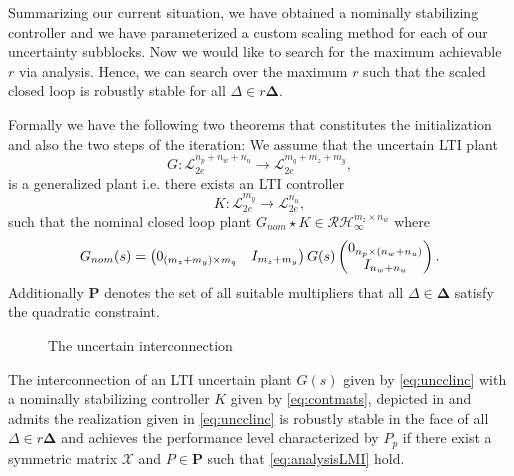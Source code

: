 Summarizing our current situation, we have obtained a nominally stabilizing controller and we have parameterized a custom scaling method for each of our 
uncertainty subblocks. Now we would like to search for the maximum achievable $r$ via analysis. Hence, we can search over the maximum $r$ such that the 
scaled closed loop is robustly stable for all $\Delta\in r\bm{\Delta}$. 



Formally we have the following two theorems that constitutes the initialization and also the two steps of the iteration: We assume that 
the uncertain LTI plant 
\[
G:\mathcal{L}_{2e}^{n_p+n_w+n_u}\to\mathcal{L}_{2e}^{m_q+m_z+m_y},
\] 
is a generalized plant i.e. there exists an LTI controller 
\[
K:\mathcal{L}_{2e}^{m_y}\to\mathcal{L}_{2e}^{n_u},
\]
such that the nominal closed loop plant $G_{nom}\star K\in\mathcal{RH}_\infty^{m_z\times n_w}$ where 
\[
G_{nom}(s) = \begin{pmatrix}0_{(m_z+m_y)\times m_q} &I_{m_z+m_y}\end{pmatrix}G(s)\begin{pmatrix}0_{n_p\times(n_w+n_u)}\\I_{n_w+n_u}\end{pmatrix}. 
\]
Additionally $\mathbf{P}$ denotes the set of all suitable multipliers that all $\Delta\in\bm{\Delta}$ satisfy the 
quadratic constraint.

\begin{figure}%
\centering
{}
\caption{The uncertain interconnection}%
\label{fig:uncicsynth}%
\end{figure}

\begin{thm} The interconnection of an LTI uncertain plant $G(s)$ given by \eqref{eq:uncclinc}
with a nominally stabilizing controller $K$ given by \eqref{eq:contmats}, depicted in  
and admits the realization given in \eqref{eq:uncclinc} is robustly stable in the face of all 
$\Delta\in r\bm{\Delta}$ and achieves the performance level characterized by $P_p$ if there exist a symmetric matrix 
$\mathcal{X}$ and $P\in\mathbf{P}$ such that \eqref{eq:analysisLMI} hold.
\end{thm}

